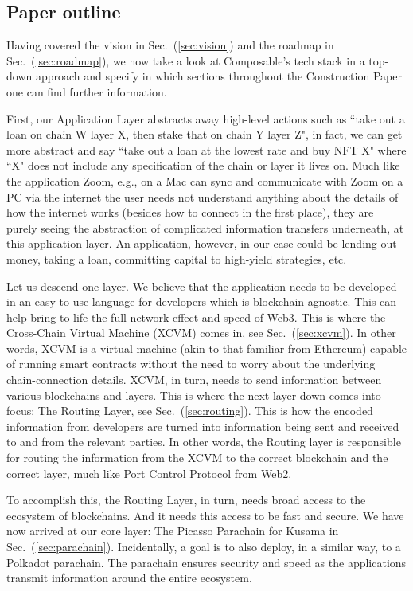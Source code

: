 \subsection{Paper outline}

Having covered the vision in Sec.~(\ref{sec:vision}) and the roadmap in Sec.~(\ref{sec:roadmap}), we now take a look at Composable's tech stack in a top-down approach and specify in which sections throughout the Construction Paper one can find further information.

First, our Application Layer abstracts away high-level actions such as ``take out a loan on chain W layer X, then stake that on chain Y layer Z", in fact, we can get more abstract and say ``take out a loan at the lowest rate and buy NFT X" where ``X" does not include any specification of the chain or layer it lives on.
%
Much like the application Zoom, e.g., on a Mac can sync and communicate with Zoom on a PC via the internet the user needs not understand anything about the details of how the internet works (besides how to connect in the first place), they are purely seeing the abstraction of complicated information transfers underneath, at this application layer.
%
An application, however, in our case could be lending out money, taking a loan, committing capital to high-yield strategies, etc.

Let us descend one layer. We believe that the application needs to be developed in an easy to use language for developers which is blockchain agnostic. This can help bring to life the full network effect and speed of Web3.
%
This is where the Cross-Chain Virtual Machine (XCVM) comes in, see Sec.~(\ref{sec:xcvm}). In other words, XCVM is a virtual machine (akin to that familiar from Ethereum) capable of running smart contracts without the need to worry about the underlying chain-connection details.
%
XCVM, in turn, needs to send information between various blockchains and layers.
%
This is where the next layer down comes into focus: The Routing Layer, see Sec.~(\ref{sec:routing}). This is how the encoded information from developers are turned into information being sent and received to and from the relevant parties.
%
In other words, the Routing layer is responsible for routing the information from the XCVM to the correct blockchain and the correct layer, much like Port Control Protocol \cite{PortWikipedia} from Web2.

To accomplish this, the Routing Layer, in turn, needs broad access to the ecosystem of blockchains. And it needs this access to be fast and secure.
%
We have now arrived at our core layer: The Picasso Parachain for Kusama in Sec.~(\ref{sec:parachain}).
%
Incidentally, a goal is to also deploy, in a similar way, to a Polkadot parachain.
%
The parachain ensures security and speed as the applications transmit information around the entire ecosystem.

